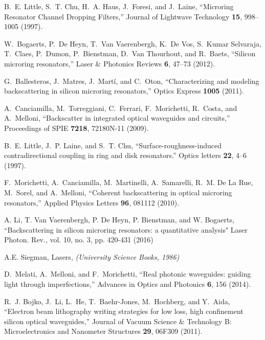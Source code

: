 \documentclass[10pt]{article}
\begin{document}
\begin{thebibliography}{1}
\newcommand{\enquote}[1]{``#1''}

B.~E. Little, S.~T. Chu, H.~A. Haus, J.~Foresi, and J.~Laine,
  \enquote{{Microring Resonator Channel Dropping Filters},} Journal of
  Lightwave Technology \textbf{15}, 998--1005 (1997).

W.~Bogaerts, P.~{De Heyn}, T.~{Van Vaerenbergh}, K.~{De Vos}, S.~{Kumar
  Selvaraja}, T.~Claes, P.~Dumon, P.~Bienstman, D.~{Van Thourhout}, and
  R.~Baets, \enquote{{Silicon microring resonators},} Laser {\&} Photonics
  Reviews \textbf{6}, 47--73 (2012).

G.~Ballesteros, J.~Matres, J.~Mart{\'{i}}, and C.~Oton,
  \enquote{{Characterizing and modeling backscattering in silicon microring
  resonators},} Optics Express \textbf{1005} (2011).

A.~Canciamilla, M.~Torreggiani, C.~Ferrari, F.~Morichetti, R.~Costa, and
  A.~Melloni, \enquote{{Backscatter in integrated optical waveguides and
  circuits},} Proceedings of SPIE \textbf{7218}, 72180N-11 (2009).

B.~E. Little, J.~P. Laine, and S.~T. Chu, \enquote{{Surface-roughness-induced
  contradirectional coupling in ring and disk resonators.}} Optics letters
  \textbf{22}, 4--6 (1997).

F.~Morichetti, A.~Canciamilla, M.~Martinelli, A.~Samarelli, R.~M. {De La Rue},
  M.~Sorel, and A.~Melloni, \enquote{{Coherent backscattering in optical
  microring resonators},} Applied Physics Letters \textbf{96}, 081112 (2010).

A. Li, T. Van Vaerenbergh, P. De Heyn, P. Bienstman, and W. Bogaerts, ``Backscattering in silicon microring resonators: a quantitative analysis" Laser Photon. Rev., vol. 10, no. 3, pp. 420-431 (2016)

A.E. Siegman, {Lasers}, \emph{ (University Science Books, 1986)}

D.~Melati, A.~Melloni, and F.~Morichetti, \enquote{{Real photonic waveguides:
  guiding light through imperfections},} Advances in Optics and Photonics
  \textbf{6}, 156 (2014).

R.~J. Bojko, J.~Li, L.~He, T.~Baehr-Jones, M.~Hochberg, and Y.~Aida,
  \enquote{{Electron beam lithography writing strategies for low loss, high
  confinement silicon optical waveguides},} Journal of Vacuum Science {\&}
  Technology B: Microelectronics and Nanometer Structures \textbf{29}, 06F309
  (2011).

\end{thebibliography}
\end{document}

